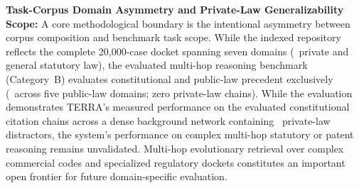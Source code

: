 \item \textbf{Task-Corpus Domain Asymmetry and Private-Law Generalizability Scope:} A core methodological boundary is the intentional asymmetry between corpus composition and benchmark task scope. While the indexed repository reflects the complete 20,000-case docket spanning seven domains (\IssueTwentyFiveCorpusCombinedPrivateStatutoryPct\ private and general statutory law), the evaluated multi-hop reasoning benchmark (Category~B) evaluates constitutional and public-law precedent exclusively (\IssueTwentyFiveCatBConstitutionalPublicPct\ across five public-law domains; zero private-law chains). While the evaluation demonstrates TERRA's measured performance on the evaluated constitutional citation chains across a dense background network containing \CorpusPrivateLawOpinions\ private-law distractors, the system's performance on complex multi-hop statutory or patent reasoning remains unvalidated. Multi-hop evolutionary retrieval over complex commercial codes and specialized regulatory dockets constitutes an important open frontier for future domain-specific evaluation.
